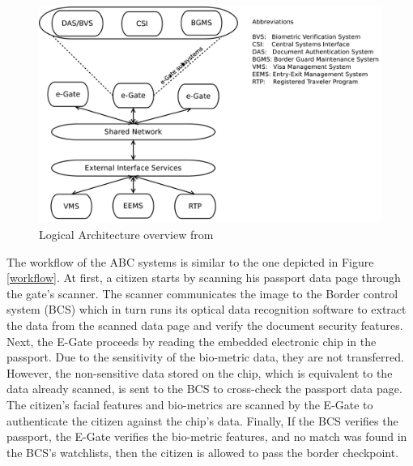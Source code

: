 \begin{figure}[H]
	\centering
	\includegraphics[scale=0.35]{Images/E-Gate-Architecture.png}
	\caption{Logical Architecture overview from \cite{labati2016biometric}}
	\label{E-Gate-Architecture}
\end{figure}

\par
The workflow of the ABC systems is similar to the one depicted in Figure \ref{workflow}. At first, a citizen starts by scanning his passport data page through the gate's scanner. The scanner communicates the image to the Border control system (BCS) which in turn runs its optical data recognition software to extract the data from the scanned data page and verify the document security features. Next, the E-Gate proceeds by reading the embedded electronic chip in the passport. Due to the sensitivity of the bio-metric data, they are not transferred. However, the non-sensitive data stored on the chip, which is equivalent to the data already scanned, is sent to the BCS to cross-check the passport data page. The citizen's facial features and bio-metrics are scanned by the E-Gate to authenticate the citizen against the chip's data. Finally, If the BCS verifies the passport, the E-Gate verifies the bio-metric features, and no match was found in the BCS's watchlists, then the citizen is allowed to pass the border checkpoint.

